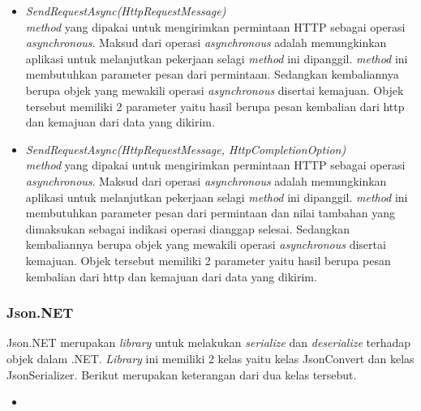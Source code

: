 \begin{itemize}
	\item \textit{SendRequestAsync(HttpRequestMessage)} \\
	\textit{method} yang dipakai untuk mengirimkan permintaan HTTP sebagai operasi \textit{asynchronous}. Maksud dari operasi \textit{asynchronous} adalah memungkinkan aplikasi untuk melanjutkan pekerjaan selagi \textit{method} ini dipanggil\footnotemark[2]. \textit{method} ini membutuhkan parameter pesan dari permintaan. Sedangkan kembaliannya berupa objek yang mewakili operasi \textit{asynchronous} disertai kemajuan. Objek tersebut memiliki 2 parameter yaitu hasil berupa pesan kembalian dari http dan kemajuan dari data yang dikirim.
	\item \textit{SendRequestAsync(HttpRequestMessage, HttpCompletionOption)} \\
	\textit{method} yang dipakai untuk mengirimkan permintaan HTTP sebagai operasi \textit{asynchronous}. Maksud dari operasi \textit{asynchronous} adalah memungkinkan aplikasi untuk melanjutkan pekerjaan selagi \textit{method} ini dipanggil\footnotemark[2]. \textit{method} ini membutuhkan parameter pesan dari permintaan dan nilai tambahan yang dimaksukan sebagai indikasi operasi dianggap selesai. Sedangkan kembaliannya berupa objek yang mewakili operasi \textit{asynchronous} disertai kemajuan. Objek tersebut memiliki 2 parameter yaitu hasil berupa pesan kembalian dari http dan kemajuan dari data yang dikirim.
\end{itemize}


\subsubsection{Json.NET}
\label{subsubsec:Json.NET}
\hspace{0.5cm} Json.NET merupakan \textit{library} untuk melakukan \textit{serialize} dan \textit{deserialize} terhadap objek dalam .NET. \textit{Library} ini memiliki 2 kelas yaitu kelas JsonConvert dan kelas JsonSerializer. Berikut merupakan keterangan dari dua kelas tersebut.
\begin{itemize}
	\item
\end{itemize}


